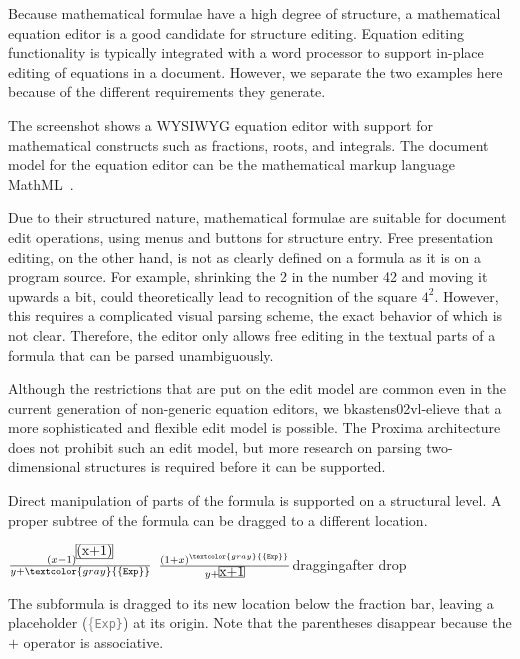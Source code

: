 Because mathematical formulae have a high degree of structure, a mathematical equation editor is a good candidate for structure editing. Equation editing functionality is typically integrated with a word processor to support in-place editing of equations in a document. However, we separate the two examples here because of the different requirements they generate.

The screenshot shows a WYSIWYG equation editor with support for mathematical constructs such as fractions, roots, and integrals. The document model for the equation editor can be the mathematical markup language MathML~\cite{mathml20}.


Due to their structured nature, mathematical formulae are suitable for document edit operations, using menus and buttons for structure entry. Free presentation editing, on the other hand, is not as clearly defined on a formula as it is on a program source. For example, shrinking the 2 in the number 42 and moving it upwards a bit, could theoretically lead to recognition of the square $4^2$. However, this requires a complicated visual parsing scheme, the exact behavior of which is not clear. Therefore, the editor only allows free editing in the textual parts of a formula that can be parsed unambiguously.

Although the restrictions that are put on the edit model are common even in the current generation of non-generic equation editors, we bkastens02vl-elieve that a more sophisticated and flexible edit model is possible. The Proxima architecture does not prohibit such an edit model, but more research on parsing two-dimensional structures is required before it can be supported.


Direct manipulation of parts of the formula is supported on a structural level. A proper subtree of the formula can be dragged to a different location.

\editScreenshot
{$ \frac{(x-1)^{\frame{(x+1)}}}{y + \textcolor{gray}{\{\tt Exp\}}}    $}
{$ \frac{(1+x)^{\textcolor{gray}{\{\tt Exp\}}} }{y + \frame{x+1}}  $}{dragging}{after drop}

The subformula is dragged to its new location below the fraction bar, leaving a placeholder (\textcolor{gray}{\{\tt Exp\}}) at its origin. Note that the parentheses disappear because the $+$ operator is associative. 

